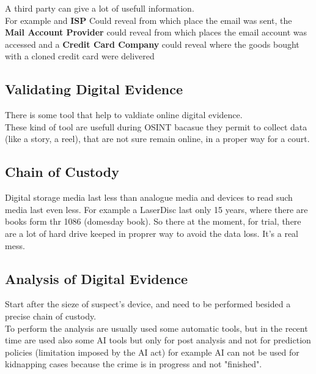 A third party can give a lot of usefull information. \\
For example and \textbf{ISP} Could reveal from which place the email was sent, the \textbf{Mail Account Provider} could reveal from which places the email account was accessed and a \textbf{Credit Card Company} could reveal where the goods bought with a cloned credit card were delivered

\subsection{Validating Digital Evidence}
There is some tool that help to valdiate online digital evidence. \\
These kind of tool are usefull during OSINT bacasue they permit to collect data (like a story, a reel), that are not sure remain online, in a proper way for a court.

\subsection{Chain of Custody}

Digital storage media last less than analogue media and devices to read such media last even less. For example a LaserDisc last only 15 years, where there are books form thr 1086 (domesday book). So there at the moment, for trial, there are a lot of hard drive keeped in proprer way to avoid the data loss. It's a real mess.

\subsection{Analysis of Digital Evidence}

Start after the sieze of suspect's device, and need to be performed besided a precise chain of custody. \\ To perform the analysis are usually used some automatic tools, but in the recent time are used also some AI tools but only for post analysis and not for prediction policies (limitation imposed by the AI act) for example AI can not be used for kidnapping cases because the crime is in progress and not "finished".

